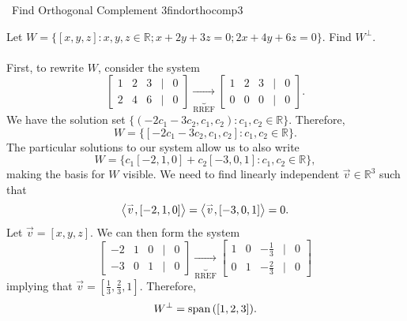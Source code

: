         \begin{example}{\Difficulty\,\Difficulty\,\,Find Orthogonal Complement 3}{findorthocomp3}

            Let \(W=\{[x,y,z]:x,y,z\in\mathbb{R};x+2y+3z=0;2x+4y+6z=0\}\). Find \(W^\perp\).
            \\
            \\
            First, to rewrite \(W\), consider the system
            \begin{equation*}
                \begin{bmatrix}
                    1 & 2 & 3 & | & 0 \\
                    2 & 4 & 6 & | & 0
                \end{bmatrix}\underbrace{\to}_\text{RREF}
                \begin{bmatrix}
                    1 & 2 & 3 & | & 0 \\
                    0 & 0 & 0 & | & 0
                \end{bmatrix}.
            \end{equation*}
            We have the solution set \(\{(-2c_1-3c_2,c_1,c_2):c_1,c_2\in\mathbb{R}\}\). Therefore,
            \begin{equation*}
                W=\{[-2c_1-3c_2,c_1,c_2]:c_1,c_2\in\mathbb{R}\}.
            \end{equation*}
            The particular solutions to our system allow us to also write
            \begin{equation*}
                W=\{c_1[-2,1,0]+c_2[-3,0,1]:c_1,c_2\in\mathbb{R}\},
            \end{equation*}
            making the basis for \(W\) visible. We need to find linearly independent \(\vec{v}\in\mathbb{R}^3\) such that
            \begin{equation*}
                \left\langle \overset{_{\rightharpoonup}}{v},[-2,1,0]\right\rangle=\left\langle \overset{_{\rightharpoonup}}{v},[-3,0,1]\right\rangle=0.
            \end{equation*}
            Let \(\vec{v}=[x,y,z]\). We can then form the system
            \begin{equation*}
                \begin{bmatrix}
                    -2 & 1 & 0 & | & 0 \\
                    -3 & 0 & 1 & | & 0
                \end{bmatrix}\underbrace{\to}_\text{RREF}
                \begin{bmatrix}
                    1 & 0 & -\frac{1}{3} & | & 0 \\
                    0 & 1 & -\frac{2}{3} & | & 0
                \end{bmatrix}
            \end{equation*}
            implying that \(\vec{v}=[\frac{1}{3},\frac{2}{3},1]\). Therefore,
            \begin{equation*}
                W^\perp=\text{span\,}([1,2,3]).
            \end{equation*}
        \end{example}
